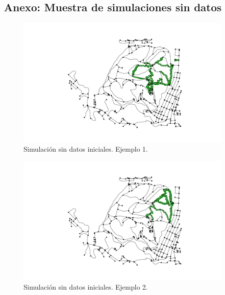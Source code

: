 \subsection{Anexo: Muestra de simulaciones sin datos} \label{subseciton:SimulationSample}\begin{figure}[h]
\begin{center}
\includegraphics[width=0.95\textwidth]{./Imagenes/empty-simulation/track1.png}
\caption{Simulación sin datos iniciales. Ejemplo 1.}
\end{center}
\label{figure:Simulation1}
\end{figure}

\begin{figure}[h]
\begin{center}
\includegraphics[width=0.95\textwidth]{./Imagenes/empty-simulation/track2.png}
\caption{Simulación sin datos iniciales. Ejemplo 2.}
\end{center}
\label{figure:Simulation2}
\end{figure}

